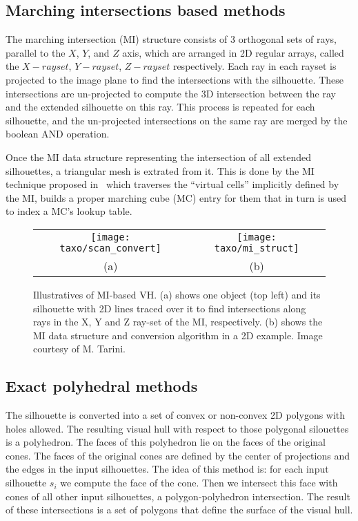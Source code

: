 \subsection{Marching intersections based methods}
The marching intersection (MI) structure consists of 3 orthogonal sets of rays, parallel to the $X$, $Y$, and $Z$ axis, which are arranged in 2D regular arrays, called the $X-rayset$, $Y-rayset$, $Z-rayset$ respectively. Each ray in each rayset is projected to the image plane to find the intersections with the silhouette. These intersections are un-projected to compute the 3D intersection between the ray and the extended silhouette on this ray. This process is repeated for each silhouette, and the un-projected intersections on the same ray are merged by the boolean AND operation.

Once the MI data structure representing the intersection of all extended silhouettes, a triangular mesh is extrated from it. This is done by the MI technique proposed in~\cite{rocchini2001marching} which traverses the ``virtual cells'' implicitly defined by the MI, builds a proper marching cube (MC) entry for them that in turn is used to index a MC's lookup table.

\begin{figure}[h]
\centering
\begin{tabular}{cc}
\texttt{[image: taxo/scan\_convert]}&
\texttt{[image: taxo/mi\_struct]}\\
(a) & (b)\\
\end{tabular}
\caption{Illustratives of MI-based VH. (a) shows one object (top left) and its silhouette with 2D lines traced over it to find intersections along rays in the X, Y and Z ray-set of the MI, respectively. (b) shows the MI data structure and conversion algorithm in a 2D example. Image courtesy of M. Tarini.}
\label{fig:robust_pc}
\end{figure}

\subsection{Exact polyhedral methods}
The silhouette is converted into a set of convex or non-convex 2D polygons with holes allowed. The resulting visual hull with respect to those polygonal silouettes is a polyhedron. The faces of this polyhedron lie on the faces of the original cones. The faces of the original cones are defined by the center of projections and the edges in the input silhouettes. The idea of this method is: for each input silhouette $s_i$ we compute the face of the cone. Then we intersect this face with cones of all other input silhouettes, \ie a polygon-polyhedron intersection. The result of these intersections is a set of polygons that define the surface of the visual hull.

